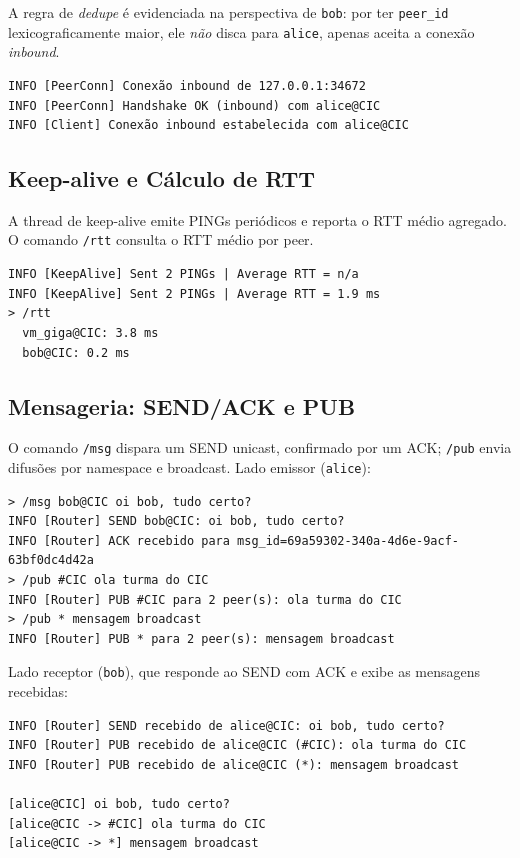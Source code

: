 \documentclass[12pt, a4paper]{article}
\begin{document}
A regra de \textit{dedupe} é evidenciada na perspectiva de \texttt{bob}: por ter \texttt{peer\_id} lexicograficamente maior, ele \textit{não} disca para \texttt{alice}, apenas aceita a conexão \textit{inbound}.

\begin{lstlisting}[style=terminal]
INFO [PeerConn] Conexão inbound de 127.0.0.1:34672
INFO [PeerConn] Handshake OK (inbound) com alice@CIC
INFO [Client] Conexão inbound estabelecida com alice@CIC
\end{lstlisting}

\subsection{Keep-alive e Cálculo de RTT}
A thread de keep-alive emite PINGs periódicos e reporta o RTT médio agregado. O comando \texttt{/rtt} consulta o RTT médio por peer.

\begin{lstlisting}[style=terminal]
INFO [KeepAlive] Sent 2 PINGs | Average RTT = n/a
INFO [KeepAlive] Sent 2 PINGs | Average RTT = 1.9 ms
> /rtt
  vm_giga@CIC: 3.8 ms
  bob@CIC: 0.2 ms
\end{lstlisting}

\subsection{Mensageria: SEND/ACK e PUB}
O comando \texttt{/msg} dispara um SEND unicast, confirmado por um ACK; \texttt{/pub} envia difusões por namespace e broadcast. Lado emissor (\texttt{alice}):

\begin{lstlisting}[style=terminal]
> /msg bob@CIC oi bob, tudo certo?
INFO [Router] SEND bob@CIC: oi bob, tudo certo?
INFO [Router] ACK recebido para msg_id=69a59302-340a-4d6e-9acf-63bf0dc4d42a
> /pub #CIC ola turma do CIC
INFO [Router] PUB #CIC para 2 peer(s): ola turma do CIC
> /pub * mensagem broadcast
INFO [Router] PUB * para 2 peer(s): mensagem broadcast
\end{lstlisting}

Lado receptor (\texttt{bob}), que responde ao SEND com ACK e exibe as mensagens recebidas:

\begin{lstlisting}[style=terminal]
INFO [Router] SEND recebido de alice@CIC: oi bob, tudo certo?
INFO [Router] PUB recebido de alice@CIC (#CIC): ola turma do CIC
INFO [Router] PUB recebido de alice@CIC (*): mensagem broadcast

[alice@CIC] oi bob, tudo certo?
[alice@CIC -> #CIC] ola turma do CIC
[alice@CIC -> *] mensagem broadcast
\end{lstlisting}
\end{document}
